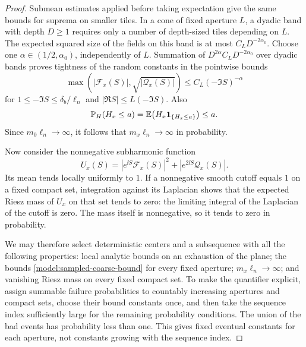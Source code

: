 \begin{proof}
Submean estimates applied before taking expectation give the same
bounds for suprema on smaller tiles.  In a cone of fixed aperture
\(L\), a dyadic band with depth \(D\ge1\) requires only a number of
depth-sized tiles depending on \(L\).  The expected squared size of
the fields on this band is at most \(C_LD^{-2\alpha_0}\).
Choose one \(\alpha\in(1/2,\alpha_0)\), independently of \(L\).
Summation of
\(D^{2\alpha}C_LD^{-2\alpha_0}\) over dyadic bands proves tightness
of the random constants in the pointwise bounds
\begin{equation}
\label{model:sampled-coarse-bound}
 \max(|\mathcal F_x(S)|,\sqrt{|\mathcal Q_x(S)|})
 \le C_L(-\Im S)^{-\alpha}
\end{equation}
for \(1\le-\Im S\le\delta_b/\ell_n\) and
\(|\Re S|\le L(-\Im S)\).
Also
\[
 \mathbb P_H(H_x\le a)=\mathbb E\bigl(H_x\mathbf 1_{\{H_x\le a\}}\bigr)\le a.
\]
Since \(m_0\ell_n\to\infty\), it follows that
\(m_x\ell_n\to\infty\) in probability.

Now consider the nonnegative subharmonic function
\[
 U_x(S)=|e^{\ii S}\mathcal F_x(S)|^2
       +|e^{2\ii S}\mathcal Q_x(S)|.
\]
Its mean tends locally uniformly to \(1\).  If a nonnegative smooth
cutoff equals \(1\) on a fixed compact set, integration against its
Laplacian shows that the expected Riesz mass of \(U_x\) on that set
tends to zero: the limiting integral of the Laplacian of the cutoff
is zero.  The mass itself is nonnegative, so it tends to zero in
probability.

We may therefore select deterministic centers and a subsequence with
all the following properties: local analytic bounds on an exhaustion
of the plane; the bounds \eqref{model:sampled-coarse-bound} for every
fixed aperture; \(m_x\ell_n\to\infty\); and vanishing Riesz mass on
every fixed compact set.  To make the quantifier explicit, assign
summable failure probabilities to countably increasing apertures
and compact sets, choose their bound constants once, and then take
the sequence index sufficiently large for the remaining probability
conditions.  The union of the bad events has probability less than
one.  This gives fixed eventual constants for each aperture, not
constants growing with the sequence index.


\end{proof}
